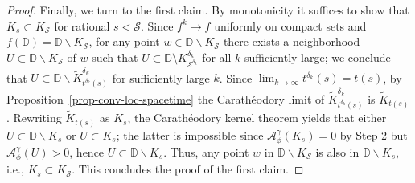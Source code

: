 \documentclass[10pt,a4paper]{amsart}
\newcommand{\D}{\mathbb{D}}
\newcommand{\cA}{\mathcal{A}}
\newcommand{\qduration}{\mathcal{S}}
\begin{document}
\begin{proof}
  Finally, we turn to the first claim. By monotonicity it suffices to show that $K_s \subset K_\qduration$ for rational $s < \qduration$. Since $f^k \to f$ uniformly on compact sets and $f(\D) = \D \backslash K_\qduration$, for any point $w \in \D \backslash K_\qduration$ there exists a neighborhood $U \subset \D \backslash K_\qduration$ of $w$ such that $U \subset \D \setminus K_{\qduration^{\delta_k}}^{\delta_k}$ for all $k$ sufficiently large; we conclude that $U \subset \D \backslash \tilde K^{\delta_k}_{t^{\delta_k}(s)}$ for sufficiently large $k$.
    Since $\lim_{k\to\infty} t^{\delta_k}(s) = t(s)$, by Proposition~\ref{prop-conv-loc-spacetime} the Carath\'eodory limit of $\tilde K^{\delta_k}_{t^{\delta_k}(s)}$ is $\tilde K_{t(s)}$. Rewriting $\tilde K_{t(s)}$ as $K_s$, the Carath\'eodory kernel theorem yields that either $U \subset \D \backslash K_s$ or $U \subset K_s$; the latter is impossible since $\cA^\gamma_\phi(K_s) = 0$ by Step 2 but $\cA^\gamma_\phi(U) > 0$, hence $U \subset \D \backslash K_s$. Thus, any point $w$ in $\D \backslash K_\qduration$ is also in $\D \backslash K_s$, i.e., $K_s \subset K_\qduration$. This concludes the proof of the first claim. 
\end{proof}
\end{document}
